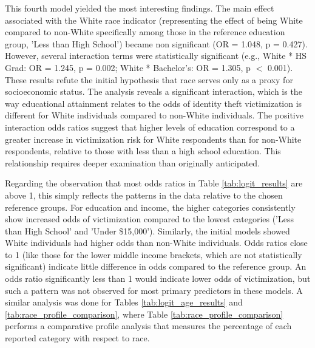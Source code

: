 This fourth model yielded the most interesting findings. The main effect associated with the White race indicator (representing the effect of being White compared to non-White specifically among those in the reference education group, 'Less than High School') became non significant (OR = 1.048, p = 0.427). However, several interaction terms were statistically significant (e.g., White * HS Grad: OR = 1.245, p = 0.002; White * Bachelor's: OR = 1.305, p $<$ 0.001). These results refute the initial hypothesis that race serves only as a proxy for socioeconomic status. The analysis reveals a significant interaction, which is the way educational attainment relates to the odds of identity theft victimization is different for White individuals compared to non-White individuals. The positive interaction odds ratios suggest that higher levels of education correspond to a greater increase in victimization risk for White respondents than for non-White respondents, relative to those with less than a high school education. This relationship requires deeper examination than originally anticipated.

Regarding the observation that most odds ratios in Table \ref{tab:logit_results} are above 1, this simply reflects the patterns in the data relative to the chosen reference groups. For education and income, the higher categories consistently show increased odds of victimization compared to the lowest categories ('Less than High School' and 'Under \$15,000'). Similarly, the initial models showed White individuals had higher odds than non-White individuals. Odds ratios close to 1 (like those for the lower middle income brackets, which are not statistically significant) indicate little difference in odds compared to the reference group. An odds ratio significantly less than 1 would indicate lower odds of victimization, but such a pattern was not observed for most primary predictors in these models. A similar analysis was done for Tables \ref{tab:logit_age_results} and \ref{tab:race_profile_comparison}, where Table \ref{tab:race_profile_comparison} performs a comparative profile analysis that measures the percentage of each reported category with respect to race.


